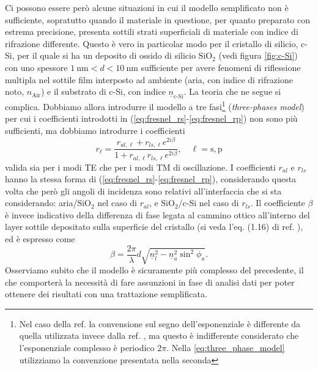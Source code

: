 \documentclass[
    prb,altaffilletter,citeautoscript,
    amsmath,amssymb,
    showpacs,showkeys,floatfix,
    reprint
]{revtex4-1}
\begin{document}
Ci possono essere però alcune situazioni in cui il modello semplificato non è sufficiente, sopratutto quando il materiale in questione, per quanto preparato con estrema precisione, presenta sottili strati superficiali di materiale con indice di rifrazione differente. Questo è vero in particolar modo per il cristallo di silicio, c-Si, per il quale si ha un deposito di ossido di silicio $\mathrm{SiO_2}$ (vedi figura \ref{fig:c-Si}) con uno spessore $\SI{1}{\nano\metre}<d<\SI{10}{\nano\metre}$ sufficiente per avere fenomeni di riflessione multipla nel sottile film interposto ad ambiente (aria, con indice di rifrazione noto, $n_\mathrm{Air}$) e il substrato di c-Si, con indice $\underline n_\text{c-Si}$. La teoria che ne segue si complica. Dobbiamo allora introdurre il modello a tre fasi\footnote{Nel caso della ref. {} la convensione sul segno dell'esponenziale è differente da quella utilizzata invece dalla ref. {}, ma questo è indifferente considerato che l'esponenziale complesso è periodico $2\pi$. Nella \eqref{eq:three_phase_model} utilizziamo la convenzione presentata nella seconda} (\emph{three-phases model}\cite{cobetEllipsometrySurveyConcept2018, hinrichsEllipsometryFunctionalOrganic2018, yehOpticalWavesLayered1988}) per cui i coefficienti introdotti in (\ref{eq:fresnel_rs}-\ref{eq:fresnel_rp}) non sono più sufficienti, ma dobbiamo introdurre i coefficienti \begin{equation}
    r_\ell = \frac{r_{al, \ell} + r_{ls, \ell}e^{2i\beta}}{1 + r_{al, \ell}r_{ls,\ell}e^{2i\beta}},\quad \ell = \mathrm{s,p}\label{eq:three_phase_model}
\end{equation} valida sia per i modi TE che per i modi TM di oscillazione. I coefficienti $r_{al}$ e $r_{ls}$ hanno la stessa forma di (\ref{eq:fresnel_rs}-\ref{eq:fresnel_rp}), considerando questa volta che però gli angoli di incidenza sono relativi all'interfaccia che si sta considerando: aria/$\mathrm{SiO_2}$ nel caso di $r_{al}$, e $\mathrm{SiO_2}$/c-Si nel caso di $r_{ls}$. Il coefficiente $\beta$ è invece indicativo della differenza di fase legata al cammino ottico all'interno del layer sottile depositato sulla superficie del cristallo (si veda l'eq. (1.16) di ref. ), ed è espresso come \begin{equation}
    \beta = \frac{2\pi}{\lambda} d \sqrt{\underline n_l^2 - \underline n_a^2 \sin^2\phi_a}.\label{eq:beta_coeff}
\end{equation} Osserviamo subito che il modello è sicuramente più complesso del precedente, il che comporterà la necessità di fare assunzioni in fase di analisi dati per poter ottenere dei risultati con una trattazione semplificata. 
\end{document}
